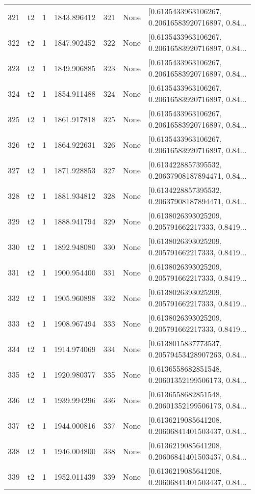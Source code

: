\begin{tabular}{lllrlll}
321 &  t2 &   1 &  1843.896412 &  321 &  None &  [0.6135433963106267, 0.20616583920716897, 0.84... \\
322 &  t2 &   1 &  1847.902452 &  322 &  None &  [0.6135433963106267, 0.20616583920716897, 0.84... \\
323 &  t2 &   1 &  1849.906885 &  323 &  None &  [0.6135433963106267, 0.20616583920716897, 0.84... \\
324 &  t2 &   1 &  1854.911488 &  324 &  None &  [0.6135433963106267, 0.20616583920716897, 0.84... \\
325 &  t2 &   1 &  1861.917818 &  325 &  None &  [0.6135433963106267, 0.20616583920716897, 0.84... \\
326 &  t2 &   1 &  1864.922631 &  326 &  None &  [0.6135433963106267, 0.20616583920716897, 0.84... \\
327 &  t2 &   1 &  1871.928853 &  327 &  None &  [0.6134228857395532, 0.20637908187894471, 0.84... \\
328 &  t2 &   1 &  1881.934812 &  328 &  None &  [0.6134228857395532, 0.20637908187894471, 0.84... \\
329 &  t2 &   1 &  1888.941794 &  329 &  None &  [0.6138026393025209, 0.205791662217333, 0.8419... \\
330 &  t2 &   1 &  1892.948080 &  330 &  None &  [0.6138026393025209, 0.205791662217333, 0.8419... \\
331 &  t2 &   1 &  1900.954400 &  331 &  None &  [0.6138026393025209, 0.205791662217333, 0.8419... \\
332 &  t2 &   1 &  1905.960898 &  332 &  None &  [0.6138026393025209, 0.205791662217333, 0.8419... \\
333 &  t2 &   1 &  1908.967494 &  333 &  None &  [0.6138026393025209, 0.205791662217333, 0.8419... \\
334 &  t2 &   1 &  1914.974069 &  334 &  None &  [0.6138015837773537, 0.20579453428907263, 0.84... \\
335 &  t2 &   1 &  1920.980377 &  335 &  None &  [0.6136558682851548, 0.20601352199506173, 0.84... \\
336 &  t2 &   1 &  1939.994296 &  336 &  None &  [0.6136558682851548, 0.20601352199506173, 0.84... \\
337 &  t2 &   1 &  1944.000816 &  337 &  None &  [0.6136219085641208, 0.20606841401503437, 0.84... \\
338 &  t2 &   1 &  1946.004800 &  338 &  None &  [0.6136219085641208, 0.20606841401503437, 0.84... \\
339 &  t2 &   1 &  1952.011439 &  339 &  None &  [0.6136219085641208, 0.20606841401503437, 0.84... \\

\end{tabular}
